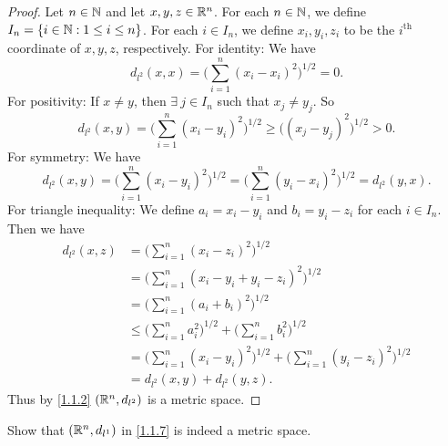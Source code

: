 \begin{proof}
  Let \(n \in \mathbb{N}\) and let \(x, y, z \in \mathbb{R}^n\).
  For each \(n \in \mathbb{N}\), we define \(I_n = \{i \in \mathbb{N} : 1 \leq i \leq n\}\).
  For each \(i \in I_n\), we define \(x_i, y_i, z_i\) to be the \(i^{\text{th}}\) coordinate of \(x, y, z\), respectively.
  For identity:
  We have
  \[
    d_{l^2}(x, x) = \bigg(\sum_{i = 1}^n (x_i - x_i)^2\bigg)^{1 / 2} = 0.
  \]
  For positivity:
  If \(x \neq y\), then \(\exists\ j \in I_n\) such that \(x_j \neq y_j\).
  So
  \[
    d_{l^2}(x, y) = \bigg(\sum_{i = 1}^n (x_i - y_i)^2\bigg)^{1 / 2} \geq \big((x_j - y_j)^2\big)^{1 / 2} > 0.
  \]
  For symmetry:
  We have
  \[
    d_{l^2}(x, y) = \bigg(\sum_{i = 1}^n (x_i - y_i)^2\bigg)^{1 / 2} = \bigg(\sum_{i = 1}^n (y_i - x_i)^2\bigg)^{1 / 2} = d_{l^2}(y, x).
  \]
  For triangle inequality:
  We define \(a_i = x_i - y_i\) and \(b_i = y_i - z_i\) for each \(i \in I_n\).
  Then we have
  \begin{align*}
    d_{l^2}(x, z) & = \bigg(\sum_{i = 1}^n (x_i - z_i)^2\bigg)^{1 / 2}                                                    \\
                  & = \bigg(\sum_{i = 1}^n (x_i - y_i + y_i - z_i)^2\bigg)^{1 / 2}                                        \\
                  & = \bigg(\sum_{i = 1}^n (a_i + b_i)^2\bigg)^{1 / 2}                                                    \\
                  & \leq \bigg(\sum_{i = 1}^n a_i^2\bigg)^{1 / 2} + \bigg(\sum_{i = 1}^n b_i^2\bigg)^{1 / 2}              \\
                  & = \bigg(\sum_{i = 1}^n (x_i - y_i)^2\bigg)^{1 / 2} + \bigg(\sum_{i = 1}^n (y_i - z_i)^2\bigg)^{1 / 2} \\
                  & = d_{l^2}(x, y) + d_{l^2}(y, z).
  \end{align*}
  Thus by \cref{1.1.2} \((\mathbb{R}^n, d_{l^2})\) is a metric space.
\end{proof}

\begin{ex}\label{ex:1.1.7}
  Show that \((\mathbb{R}^n, d_{l^1})\) in \cref{1.1.7} is indeed a metric space.
\end{ex}

